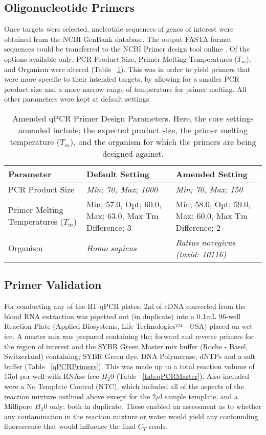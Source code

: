 \subsection{Oligonucleotide Primers}
Once targets were selected, nucleotide sequences of genes of interest were obtained from the NCBI GenBank database. The output FASTA format sequences could be transferred to the NCBI Primer design tool online \cite{Ye2012}. Of the options available only; PCR Product Size, Primer Melting Temperatures ($T_{m}$), and Organism were altered (Table ~\ref{Amended qPCR Primer Design Parameters}). This was in order to yield primers that were more specific to their intended targets, by allowing for a smaller PCR product size and a more narrow range of temperature for primer melting. All other parameters were kept at default settings. \\

\begin{table}[!hbtp]
\small
\centering
\begin{tabular}{p{3cm}|p{5cm}|p{5cm}}
Parameter & Default Setting & Amended Setting \\
\hline
PCR Product Size & \textit{Min; 70, Max; 1000} & \textit{Min; 70, Max; 150} \\
Primer Melting Temperatures ($T_{m}$) & Min; 57.0, Opt; 60.0, Max; 63.0, Max Tm Difference; 3 & Min; 58.0, Opt; 59.0, Max; 60.0, Max Tm Difference; 2 \\
Organism & \textit{Homo sapiens} & \textit{Rattus novegicus (taxid: 10116)}
\end{tabular}
\caption[Amended qPCR Primer Design Parameters]{Amended qPCR Primer Design Parameters. Here, the core settings amended include; the expected product size, the primer melting temperature (\textit{$T_{m}$}), and the organism for which the primers are being designed against.}
\label{Amended qPCR Primer Design Parameters}	
\end{table}


\subsection{Primer Validation}
For conducting any of the RT-qPCR plates, 2$\mu$l of cDNA converted from the blood RNA extraction was pipetted out (in duplicate) into a 0.1mL 96-well Reaction Plate (Applied Biosystems, Life Technologies™ - USA) placed on wet ice. A master mix was prepared containing the; forward and reverse primers for the region of interest and the SYBR Green Master mix buffer (Roche - Basel, Switzerland) containing; SYBR Green dye, DNA Polymerase, dNTPs and a salt buffer (Table ~\ref{qPCRPrimers}). This was made up to a total reaction volume of 13$\mu$l per well with RNAse free $H_{2}0$ (Table ~\ref{tab:qPCRMaster}). Also included were a No Template Control (NTC), which included all of the aspects of the reaction mixture outlined above except for the 2$\mu$l sample template, and a Millipore $H_{2}0$ only; both in duplicate. These enabled an assessment as to whether any contamination in the reaction mixture or water would yield any confounding fluorescence that would influence the final $C_{T}$ reads.

